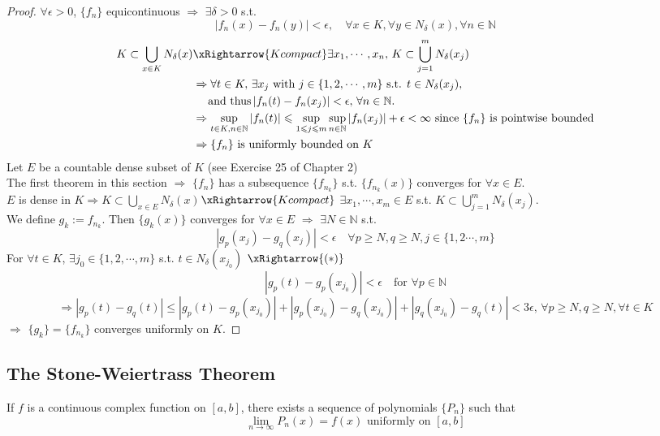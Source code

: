 \begin{proof}
     $ \forall \epsilon>0 $, $ \{f_n\} $ equicontinuous $ \Rightarrow  $  $ \exists\delta>0  $ s.t.
     \[|f_n(x)-f_n(y)|<\epsilon,\quad\forall x\in K, \forall y\in N_\delta(x),\forall n\in \mathbb{N}\tag{ $ \ast $ }\] 
     \begin{align*}
        K\subset \bigcup\limits_{x\in K }N_\delta(x)&\xRightarrow{  K  compact}\exists x_1,\cdots,x_n,\, K\subset \bigcup\limits_{j=1}^m N_\delta(x_j)\\
        &\Rightarrow \forall t\in K,\, \exists x_j\text{ with } j\in \{1,2,\cdots,m\} \text{ s.t. } t\in N_\delta(x_j),\\&\quad\text{ and thus}\, |f_n(t)-f_n(x_j)|<\epsilon,\,\forall n\in \mathbb{N}.\\
        &\Rightarrow \sup\limits_{t\in K, n\in \mathbb{N}}|f_n(t)| \leqslant\sup\limits_{1 \leqslant j \leqslant m}\sup\limits_{n\in \mathbb{N}}|f_n(x_j)|+\epsilon<\infty\text{ since  $ \{f_n\} $ is pointwise bounded}\\
        &\Rightarrow \{f_n\}\text{ is uniformly bounded on  $ K  $ } 
     \end{align*} 
    Let  $ E  $ be a countable dense subset of  $ K  $ (see Exercise 25 of Chapter 2)\\
    The first theorem in this section  $ \Rightarrow  $  $ \{f_n \} $ has a subsequence  $ \{f_{n_k } \} $ s.t.  $ \{f_{n_k}(x)\} $ converges for  $ \forall x\in E $.\\
     $ E  $ is dense in  $ K  $$ \Rightarrow  $$ K\subset\bigcup\limits_{x\in E }N_\delta(x) $$ \xRightarrow{K compact}  $ $ \exists x_1,\cdots,x_m\in E  $ s.t. $ K\subset \bigcup\limits_{j=1}^m N_\delta(x_j ) $.\\
     We define  $ g_k:=f_{n_k} $. Then  $ \{g_k(x) \} $ converges for  $ \forall x\in E  $  $ \Rightarrow $  $ \exists N\in \mathbb{N } $ s.t.
     \[|g_p(x_j)-g_q(x_j)|<\epsilon\quad\forall p\geqslant N,q\geqslant N,j\in\{1,2\cdots,m\}\]
     For  $ \forall t\in K  $,  $ \exists j_0\in\{1,2,\cdots,m \} $ s.t.  $ t\in N_\delta(x_{j_0}) $  $ \xRightarrow{(\ast)} $ 
     \[|g_p(t)-g_p(x_{j_0})|<\epsilon\quad \text{for }\forall p\in \mathbb{N}\]
     \[\Rightarrow |g_p(t)-g_q(t)| \leqslant |g_p(t)-g_p(x_{j_0})|+|g_p(x_{j_0})-g_q(x_{j_0})|+|g_q(x_{j_0})-g_q(t)|<3\epsilon,\,\forall  p\geqslant N,q\geqslant N,\forall t\in K\]
      $ \Rightarrow $ $ \{g_k\}=\{f_{n_k}\} $ converges uniformly on  $ K  $.   

\end{proof}
\subsection{The Stone-Weiertrass Theorem}

\begin{theorem}
    If  $ f  $ is a continuous complex function on  $ [a,b] $, there exists a sequence of polynomials $ \{P_n \} $ such that 
    \[\lim\limits_{n\to\infty } P_n (x)=f(x) \text{ uniformly on }[a,b] \]
\end{theorem}